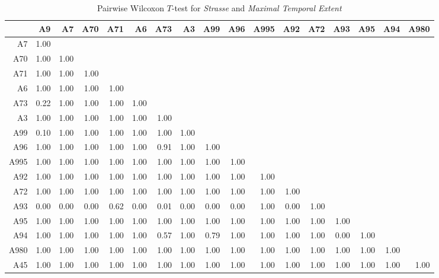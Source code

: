 \begin{table}[ht!]
	\tiny
	\setlength{\tabcolsep}{4pt}
	\centering
  \begin{tabular}{rrrrrrrrrrrrrrrrr}
    \hline
         & A9 & A7 & A70 & A71 & A6 & A73 & A3 & A99 & A96 & A995 & A92 & A72 & A93 & A95 & A94 & A980 \\ 
    \hline
    A7   & 1.00 &  &  &  &  &  &  &  &  &  &  &  &  &  &  &  \\ 
    A70  & 1.00 & 1.00 &  &  &  &  &  &  &  &  &  &  &  &  &  &  \\ 
    A71  & 1.00 & 1.00 & 1.00 &  &  &  &  &  &  &  &  &  &  &  &  &  \\ 
    A6   & 1.00 & 1.00 & 1.00 & 1.00 &  &  &  &  &  &  &  &  &  &  &  &  \\ 
    A73  & 0.22 & 1.00 & 1.00 & 1.00 & 1.00 &  &  &  &  &  &  &  &  &  &  &  \\ 
    A3   & 1.00 & 1.00 & 1.00 & 1.00 & 1.00 & 1.00 &  &  &  &  &  &  &  &  &  &  \\ 
    A99  & 0.10 & 1.00 & 1.00 & 1.00 & 1.00 & 1.00 & 1.00 &  &  &  &  &  &  &  &  &  \\ 
    A96  & 1.00 & 1.00 & 1.00 & 1.00 & 1.00 & 0.91 & 1.00 & 1.00 &  &  &  &  &  &  &  &  \\ 
    A995 & 1.00 & 1.00 & 1.00 & 1.00 & 1.00 & 1.00 & 1.00 & 1.00 & 1.00 &  &  &  &  &  &  &  \\ 
    A92  & 1.00 & 1.00 & 1.00 & 1.00 & 1.00 & 1.00 & 1.00 & 1.00 & 1.00 & 1.00 &  &  &  &  &  &  \\ 
    A72  & 1.00 & 1.00 & 1.00 & 1.00 & 1.00 & 1.00 & 1.00 & 1.00 & 1.00 & 1.00 & 1.00 &  &  &  &  &  \\ 
    A93  & 0.00 & 0.00 & 0.00 & 0.62 & 0.00 & 0.01 & 0.00 & 0.00 & 0.00 & 1.00 & 0.00 & 1.00 &  &  &  &  \\ 
    A95  & 1.00 & 1.00 & 1.00 & 1.00 & 1.00 & 1.00 & 1.00 & 1.00 & 1.00 & 1.00 & 1.00 & 1.00 & 1.00 &  &  &  \\ 
    A94  & 1.00 & 1.00 & 1.00 & 1.00 & 1.00 & 0.57 & 1.00 & 0.79 & 1.00 & 1.00 & 1.00 & 1.00 & 0.00 & 1.00 &  &  \\ 
    A980 & 1.00 & 1.00 & 1.00 & 1.00 & 1.00 & 1.00 & 1.00 & 1.00 & 1.00 & 1.00 & 1.00 & 1.00 & 1.00 & 1.00 & 1.00 &  \\ 
    A45  & 1.00 & 1.00 & 1.00 & 1.00 & 1.00 & 1.00 & 1.00 & 1.00 & 1.00 & 1.00 & 1.00 & 1.00 & 1.00 & 1.00 & 1.00 & 1.00 \\ 
    \hline
  \end{tabular}
	\caption{Pairwise Wilcoxon $T$-test for \textit{Strasse} and \textit{Maximal Temporal Extent}}
	\label{tbl:wilcoxon_baysis_matched_Strasse_TMax}
\end{table}

